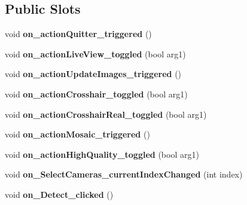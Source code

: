 \subsection*{Public Slots}
\begin{DoxyCompactItemize}
\item 
\hypertarget{class_main_window_afe9d9d46e61e2460e636619577a9e8fd}{void {\bfseries on\-\_\-action\-Quitter\-\_\-triggered} ()}\label{class_main_window_afe9d9d46e61e2460e636619577a9e8fd}

\item 
\hypertarget{class_main_window_a6e100f7370354278cbc1f7063da91f65}{void {\bfseries on\-\_\-action\-Live\-View\-\_\-toggled} (bool arg1)}\label{class_main_window_a6e100f7370354278cbc1f7063da91f65}

\item 
\hypertarget{class_main_window_a3e52c08603e2af57c0258778be0928b5}{void {\bfseries on\-\_\-action\-Update\-Images\-\_\-triggered} ()}\label{class_main_window_a3e52c08603e2af57c0258778be0928b5}

\item 
\hypertarget{class_main_window_a7bcbac1eb6da7668227bbeb4de74ee44}{void {\bfseries on\-\_\-action\-Crosshair\-\_\-toggled} (bool arg1)}\label{class_main_window_a7bcbac1eb6da7668227bbeb4de74ee44}

\item 
\hypertarget{class_main_window_a2d13c9904b463bf5345b9d836c3d7b64}{void {\bfseries on\-\_\-action\-Crosshair\-Real\-\_\-toggled} (bool arg1)}\label{class_main_window_a2d13c9904b463bf5345b9d836c3d7b64}

\item 
\hypertarget{class_main_window_a6ef83fd406e256271775757ca7e7275f}{void {\bfseries on\-\_\-action\-Mosaic\-\_\-triggered} ()}\label{class_main_window_a6ef83fd406e256271775757ca7e7275f}

\item 
\hypertarget{class_main_window_a33cc0244f0c2ef8d0ebebb9ff04b9b3f}{void {\bfseries on\-\_\-action\-High\-Quality\-\_\-toggled} (bool arg1)}\label{class_main_window_a33cc0244f0c2ef8d0ebebb9ff04b9b3f}

\item 
\hypertarget{class_main_window_af3db410280c29a5bc20939e0f73a6287}{void {\bfseries on\-\_\-\-Select\-Cameras\-\_\-current\-Index\-Changed} (int index)}\label{class_main_window_af3db410280c29a5bc20939e0f73a6287}

\item 
\hypertarget{class_main_window_a7dcbdfca99c403ecf414a9584664853e}{void {\bfseries on\-\_\-\-Detect\-\_\-clicked} ()}\label{class_main_window_a7dcbdfca99c403ecf414a9584664853e}


\end{DoxyCompactItemize}
